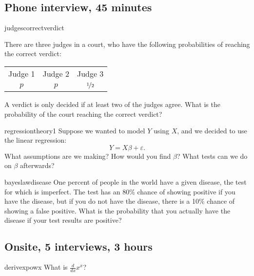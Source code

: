 \documentclass[a4paper]{article}
\begin{document}
\clearpage
\subsection{Phone interview, 45 minutes}
\begin{question}{judgescorrectverdict}

There are three judges in a court, who have the following probabilities of reaching the correct verdict:
\begin{center}
\begin{tabular}{ccc}
Judge 1 & Judge 2 & Judge 3 \\
$p$ &
$p$ &
$\nicefrac{1}{2}$ \\
\end{tabular}
\end{center}
A verdict is only decided if at least two of the judges agree.
What is the probability of the court reaching the correct verdict?
\end{question}


\begin{question}{regressiontheory1}
Suppose we wanted to model $Y$ using $X$, and we decided to use the linear regression:
\[
  Y = X \beta + \varepsilon
  \text{.}
\]
What assumptions are we making?
How would you find $\beta$?
What tests can we do on $\beta$ afterwards?
\end{question}


\begin{question}{bayeslawdisease}
One percent of people in the world have a given disease,
the test for which is imperfect.
The test has an 80\% chance of showing positive if you have the disease, but if you do not have the disease,
there is a 10\% chance of showing a false positive.
What is the probability that you actually have the disease if your test results are positive?
\end{question}

\clearpage




\clearpage
\subsection{Onsite, 5 interviews, 3 hours}
\begin{question}{derivexpowx}
What is $\frac{d}{dx}x^x$?
\end{question}
\end{document}
